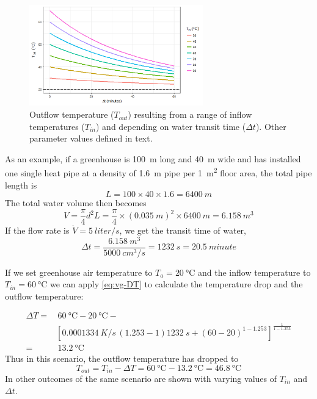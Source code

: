 \begin{figure} [ht]
\centering
\includegraphics[width=0.67\textwidth]{graphics/vg/heat-pipe-Tout.png}
\caption{Outflow temperature ($T_{out}$) resulting from a range of inflow temperatures ($T_{in}$) and depending on water transit time ($\Delta t$). Other parameter values defined in text.}
\label{fig:vg-heat-pipe-Tout}
\end{figure}

As an example, if a greenhouse is \SI{100}{m} long and \SI{40}{m} wide and has installed one single heat pipe at a density of \SI{1.6}{m} pipe per \SI{1}{m^2} floor area, the total pipe length is
\[
  L = 100\times 40 \times 1.6 = \SI{6400}{m} 
\] 
The total water volume then becomes
\[
  V = \frac{\pi}{4}d^2L = \frac{\pi}{4}\times \left( \SI{0.035}{m}\right)^2 \times \SI{6400}{m} = \SI{6.158}{m^3}
\]
If the flow rate is $\dot{V} = \SI{5}{liter/s}$, we get the transit time of water,
\[
  \Delta t = \frac{\SI{6.158}{m^3}}{\SI{5000}{cm^3/s}} = \SI{1232}{s} = \SI{20.5}{minute}
\]

If we set greenhouse air temperature to $T_a=\SI{20}{\celsius}$ and the inflow temperature to  $T_{in}=\SI{60}{\celsius}$ we can apply \cref{eq:vg-DT} to calculate the temperature drop and the outflow temperature:

\begin{align*}
  \Delta T =&\, \SI{60}{\celsius} - 
              \SI{20}{\celsius} - \\
            \phantom{=}& \left[\SI{0.0001334}{K/s}\,(1.253-1)\SI{1232}{s} + (60-20)^{1-1.253}  
              \right]^\frac{1}{1-1.253}  \\
           =&\, \SI{13.2}{\celsius}
\end{align*}
Thus in this scenario, the outflow temperature has dropped to
\[
  T_{out} = T_{in}-\Delta T = \SI{60}{\celsius}-\SI{13.2}{\celsius} = \SI{46.8}{\celsius}
\]
In  other outcomes of the same scenario are shown with varying values of $T_{in}$ and $\Delta t$. 

